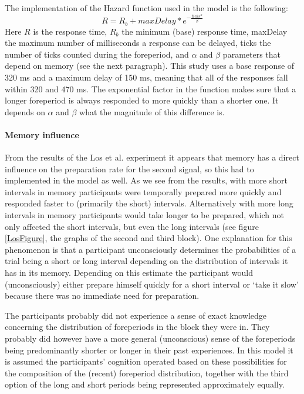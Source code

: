 \documentclass[10pt,letterpaper]{article}
\begin{document}
The implementation of the Hazard function used in the model is the following:
\begin{equation}
	R = R_b + maxDelay * e^{-\frac{ticks^\alpha}{\beta}}
\end{equation}
Here $R$ is the response time, $R_b$ the minimum (base) response time, maxDelay the maximum number of milliseconds a response can be delayed, ticks the number of ticks counted during the foreperiod, and $\alpha$ and $\beta$ parameters that depend on memory (see the next paragraph). This study uses a base response of 320 ms and a maximum delay of 150 ms, meaning that all of the responses fall within 320 and 470 ms. The exponential factor in the function makes sure that a longer foreperiod is always responded to more quickly than a shorter one. It depends on $\alpha$ and $\beta$ what the magnitude of this difference is.

\paragraph{Memory influence}
From the results of the Los et al. experiment it appears that memory has a direct influence on the preparation rate for the second signal, so this had to implemented in the model as well. As we see from the results, with more short intervals in memory participants were temporally prepared more quickly and responded faster to (primarily the short) intervals. Alternatively with more long intervals in memory participants would take longer to be prepared, which not only affected the short intervals, but even the long intervals (see figure \ref{LosFigure}, the graphs of the second and third block). One explanation for this phenomenon is that a participant unconsciously determines the probabilities of a trial being a short or long interval depending on the distribution of intervals it has in its memory. Depending on this estimate the participant would (unconsciously) either prepare himself quickly for a short interval or `take it slow' because there was no immediate need for preparation. 

The participants probably did not experience a sense of exact knowledge concerning the distribution of foreperiods in the block they were in. They probably did however have a more general (unconscious) sense of the foreperiods being predominantly shorter or longer in their past experiences. In this model it is assumed the participants' cognition operated based on these possibilities for the composition of the (recent) foreperiod distribution, together with the third option of the long and short periods being represented approximately equally.
\end{document}
